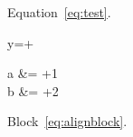 \documentclass{article}
\begin{document}
Equation~\ref{eq:test}.
\begin{annotatedequation}[numbered]
y=+\label{eq:test}
\end{annotatedequation}
\begin{annotatedalign}[numbered]
a &= +1 \\
b &= +2 \label{eq:alignblock}
\end{annotatedalign}
Block~\ref{eq:alignblock}.
\end{document}

